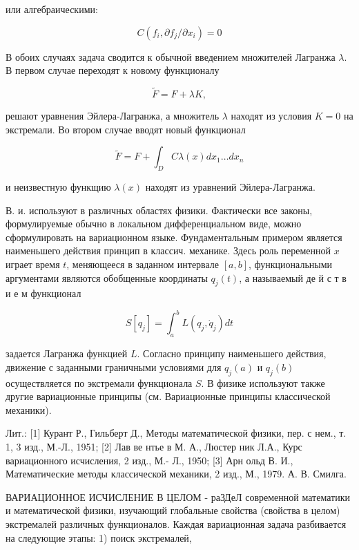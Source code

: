 \documentclass[10pt]{article}
\begin{document}
или алгебраическими:



\[

C\left(f_{i}, \partial f_{j} / \partial x_{i}\right)=0

\]



В обоих случаях задача сводится к обычной введением множителей Лагранжа $\lambda$. В первом случае переходят к новому функционалу



\[

\widetilde{F}=F+\lambda K,

\]



решают уравнения Эйлера-Лагранжа, а множитель $\lambda$ находят из условия $K=0$ на экстремали. Во втором случае вводят новый функционал



\[

\tilde{F}=F+\int_{D} C \lambda(x) d x_{1} \ldots d x_{n}

\]



и неизвестную функщию $\lambda(x)$ находят из уравнений Эйлера-Лагранжа.



В. и. используют в различных областях физики. Фактически все законы, формулируемые обычно в локальном дифференциальном виде, можно сформулировать на вариационном языке. Фундаментальным примером является наименьшего действия принцип в классич. механике. Здесь роль переменной $x$ играет время $t$, меняющееся в заданном интервале $[a, b]$, функциональными аргументами являются обобщенные координаты $q_{j}(t)$, а называемый де й с т в и е м функционал



\[

S\left[q_{j}\right]=\int_{a}^{b} L\left(q_{j}, \dot{q}_{j}\right) d t

\]



задается Лагранжа функцией $L$. Согласно принципу наименьшего действия, движение с заданными граничными условиями для $q_{j}(a)$ и $q_{j}(b)$ осуществляется по экстремали функционала $S$. В физике используют также другие вариационные принципы (см. Вариационные принципы классической механики).



Лит.: [1] Курант Р., Гильберт Д., Методы математической физики, пер. с нем., т. 1, 3 изд., М.-Л., 1951; [2] Лав ве нтье в М. А., Люстер ник Л.А., Курс вариационного исчисления, 2 изд., М.- Л., 1950; [3] Арн ольд В. И., Математические методы классической механики, 2 изд., М., 1979. А. В. Смилга.



ВАРИАЦИОННОЕ ИСЧИСЛЕНИЕ В ЦЕЛОМ - раЗДеЛ современной математики и математической физики, изучающий глобальные свойства (свойства в целом) экстремалей различных функционалов. Каждая вариационная задача разбивается на следующие этапы: 1) поиск экстремалей,
\end{document}
